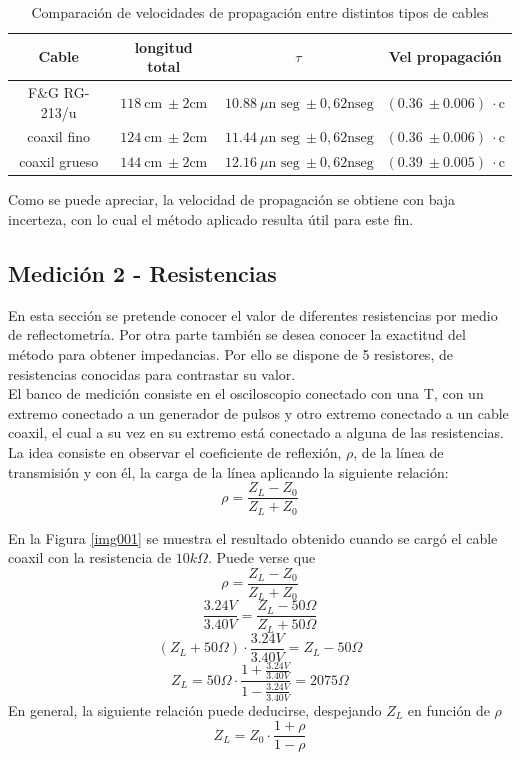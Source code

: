 \documentclass[a4paper,10pt]{article}
\begin{document}
		\begin{table}[!htp]
			\centering
			\begin{tabular}{|c|c|c|c|}
				\hline
	    		Cable & longitud total & $\tau$ & Vel propagación \\
				\hline
				F\&G RG-213/u & $118~\text{cm}~\pm2\text{cm} $ & $10.88~\mu\text{n seg}~\pm0,62\text{nseg}$ & 
				$(0.36~\pm0.006)~\cdot\text{c}$ \\
				\hline 
				coaxil fino & $124~\text{cm}~\pm2\text{cm}$ & $11.44~\mu\text{n seg}~\pm0,62\text{nseg}$ &
				$(0.36~\pm0.006)~\cdot\text{c}$ \\
				\hline
				coaxil grueso & $144~\text{cm}~\pm2\text{cm}$ & $12.16~\mu\text{n seg}~\pm0,62\text{nseg}$ & 
				$(0.39~\pm0.005)~\cdot\text{c}$ \\
				\hline
			\end{tabular}
			\caption{Comparación de velocidades de propagación entre distintos 
			tipos de cables} \label{tab001}
		\end{table}	
	 Como se puede apreciar, la velocidad de propagaci\'on se obtiene con baja incerteza, con lo cual el m\'etodo aplicado resulta \'util para este fin.

	\subsection{Medición 2 - Resistencias}
	\indent En esta sección se pretende conocer el valor de diferentes 
	resistencias por medio de reflectometr\'ia. Por otra parte tambi\'en se 
	desea conocer la exactitud del m\'etodo para obtener impedancias. Por ello
	se dispone de 5 resistores, de resistencias conocidas para contrastar su 
	valor. \\
	\indent El banco de medición consiste en el osciloscopio conectado con una
	T, con un extremo conectado a un generador de pulsos y otro extremo 
	conectado a un cable coaxil, el cual a su vez en su extremo est\'a 
	conectado a alguna de las resistencias. La idea consiste en observar el 
	coeficiente de reflexión, $\rho$, de la l\'inea de transmisión y con \'el,
	la carga de la l\'inea aplicando la siguiente relaci\'on: 
	$$\rho=\frac{Z_L-Z_0}{Z_L+Z_0}$$
	
	\indent En la Figura \ref{img001} se muestra el resultado obtenido cuando 
	se carg\'o el cable coaxil con la resistencia de $10k\Omega$. Puede verse 
	que $$\rho=\frac{Z_L-Z_0}{Z_L+Z_0}$$
	$$\frac{3.24V}{3.40V}=\frac{Z_L- 50\Omega}{Z_L+50\Omega}$$
	$$(Z_L+50\Omega) \cdot \frac{3.24V}{3.40V}=Z_L- 50\Omega$$
	$$Z_L = 50\Omega\cdot\frac{1 + \frac{3.24V}{3.40V}}{1-\frac{3.24V}{3.40V}}= 2075\Omega$$
	En general, la siguiente relaci\'on puede deducirse, despejando $Z_L$ en funci\'on de $\rho$
	$$Z_L = Z_0\cdot\frac{1 + \rho}{1-\rho} $$
\end{document}
